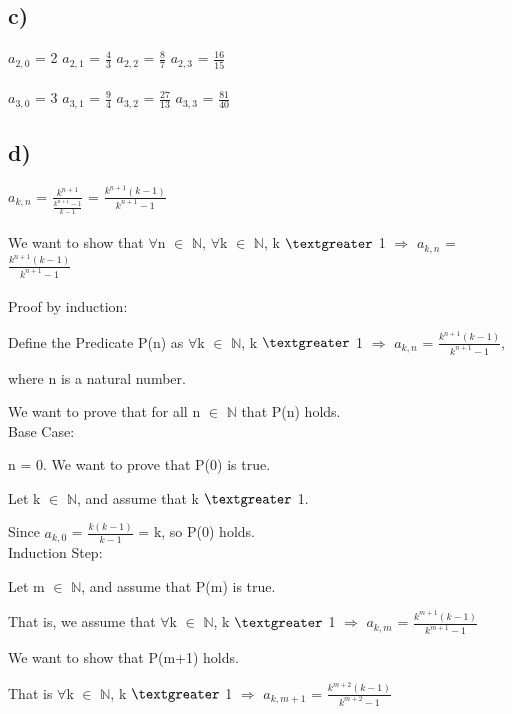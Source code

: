 \documentclass[12pt]{article}
\begin{document}
\subsection*{c)}

$a_{2,0}$ = 2 \quad $a_{2,1}$ =  $\frac{4}{3}$ \quad $a_{2,2}$ =  $\frac{8}{7}$ \quad $a_{2,3}$ =  $\frac{16}{15}$ \quad \\
~\\
$a_{3,0}$ = 3 \quad $a_{3,1}$ =  $\frac{9}{4}$ \quad $a_{3,2}$ =  $\frac{27}{13}$ \quad $a_{3,3}$ =  $\frac{81}{40}$ \quad

\newpage

\subsection*{d)}

$a_{k,n}$ = $\frac{k^{n+1}}{\frac{k^{n+1}-1}{k-1}}$ = $\frac{k^{n+1}(k-1)}{k^{n+1} - 1}$ \\
~\\
We want to show that $\forall$n $\in$ $\mathbb{N}$, $\forall$k $\in$ $\mathbb{N}$, k $\textgreater$ 1 $\Rightarrow$ $a_{k,n}$ = $\frac{k^{n+1}(k-1)}{k^{n+1} - 1}$ \\
~\\
Proof by induction:

Define the Predicate P(n) as $\forall$k $\in$ $\mathbb{N}$, k $\textgreater$ 1 $\Rightarrow$ $a_{k,n}$ = $\frac{k^{n+1}(k-1)}{k^{n+1} - 1}$,

where n is a natural number.

We want to prove that for all n $\in$ $\mathbb{N}$ that P(n) holds.\\
Base Case:

n = 0. We want to prove that P(0) is true.

Let k $\in$ $\mathbb{N}$, and assume that k $\textgreater$ 1.

Since $a_{k,0}$ =  $\frac{k(k-1)}{k-1}$ = k, so P(0) holds. \\
Induction Step:

Let m $\in$ $\mathbb{N}$, and assume that P(m) is true.

That is, we assume that $\forall$k $\in$ $\mathbb{N}$, k $\textgreater$ 1 $\Rightarrow$ $a_{k,m}$ = $\frac{k^{m+1}(k-1)}{k^{m+1} - 1}$

We want to show that P(m+1) holds.

That is $\forall$k $\in$ $\mathbb{N}$, k $\textgreater$ 1 $\Rightarrow$ $a_{k,m+1}$ = $\frac{k^{m+2}(k-1)}{k^{m+2} - 1}$
\end{document}
